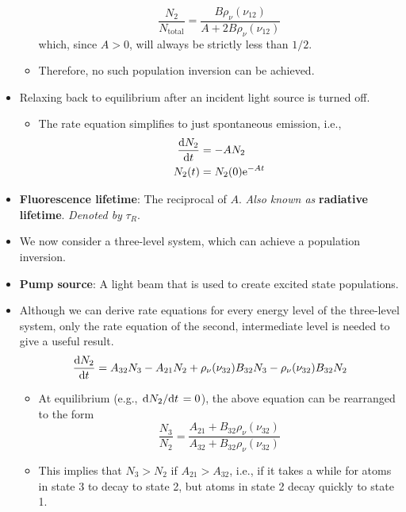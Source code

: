 \documentclass[../notes.tex]{subfiles}
\begin{document}
\begin{itemize}
\begin{itemize}
        \begin{equation*}
            \frac{N_2}{N_\text{total}} = \frac{B\rho_\nu(\nu_{12})}{A+2B\rho_\nu(\nu_{12})}
        \end{equation*}
        which, since $A>0$, will always be strictly less than $1/2$.
        \item Therefore, no such population inversion can be achieved.
    \end{itemize}
    \item Relaxing back to equilibrium after an incident light source is turned off.
    \begin{itemize}
        \item The rate equation simplifies to just spontaneous emission, i.e.,
        \begin{align*}
            \dv{N_2}{t} &= -AN_2\\
            N_2(t) &= N_2(0)\e[-At]
        \end{align*}
    \end{itemize}
    \item \textbf{Fluorescence lifetime}: The reciprocal of $A$. \emph{Also known as} \textbf{radiative lifetime}. \emph{Denoted by} $\tau_R$.
    \item {}We now consider a three-level system, which can achieve a population inversion.
    \item \textbf{Pump source}: A light beam that is used to create excited state populations.
    \item Although we can derive rate equations for every energy level of the three-level system, only the rate equation of the second, intermediate level is needed to give a useful result.
    \begin{equation*}
        \dv{N_2}{t} = A_{32}N_3-A_{21}N_2+\rho_\nu(\nu_{32})B_{32}N_3-\rho_\nu(\nu_{32})B_{32}N_2
    \end{equation*}
    \begin{itemize}
        \item At equilibrium (e.g., $\dv*{N_2}{t}=0$), the above equation can be rearranged to the form
        \begin{equation*}
            \frac{N_3}{N_2} = \frac{A_{21}+B_{32}\rho_\nu(\nu_{32})}{A_{32}+B_{32}\rho_\nu(\nu_{32})}
        \end{equation*}
        \item This implies that $N_3>N_2$ if $A_{21}>A_{32}$, i.e., if it takes a while for atoms in state 3 to decay to state 2, but atoms in state 2 decay quickly to state 1.

\end{itemize}
\end{itemize}
\end{document}
